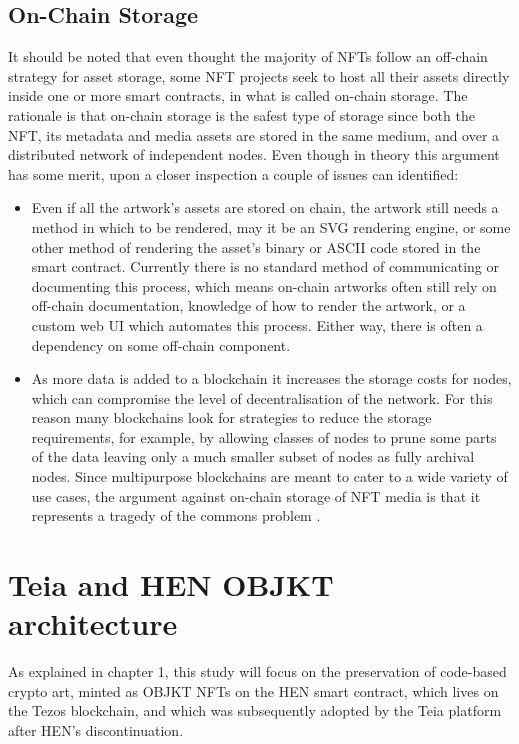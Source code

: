 \subsection{On-Chain Storage}

It should be noted that even thought the majority of NFTs follow an off-chain strategy for asset storage, some NFT projects seek to host all their assets directly inside one or more smart contracts, in what is called on-chain storage. The rationale is that on-chain storage is the safest type of storage since both the NFT, its metadata and media assets are stored in the same medium, and over a distributed network of independent nodes. Even though in theory this argument has some merit, upon a closer inspection a couple of issues can identified:
\begin{itemize}
\item Even if all the artwork's assets are stored on chain, the artwork still needs a method in which to be rendered, may it be an SVG rendering engine, or some other method of rendering the asset's binary or ASCII code stored in the smart contract. Currently there is no standard method of communicating or documenting this process, which means on-chain artworks often still rely on off-chain documentation, knowledge of how to render the artwork, or a custom web UI which automates this process. Either way, there is often a dependency on some off-chain component.  
\item As more data is added to a blockchain it increases the storage costs for nodes, which can compromise the level of decentralisation of the network. For this reason many blockchains look for strategies to reduce the storage requirements, for example, by allowing classes of nodes to prune some parts of the data leaving only a much smaller subset of nodes as fully archival nodes. Since multipurpose blockchains are meant to cater to a wide variety of use cases, the argument against on-chain storage of NFT media is that it represents a tragedy of the commons problem \cite{hardinTragedyCommonsPopulation1968}.
\end{itemize}

\section{Teia and HEN OBJKT architecture}

As explained in chapter 1, this study will focus on the preservation of code-based crypto art, minted as OBJKT NFTs on the HEN smart contract, which lives on the Tezos blockchain, and which was subsequently adopted by the Teia platform after HEN's discontinuation.

